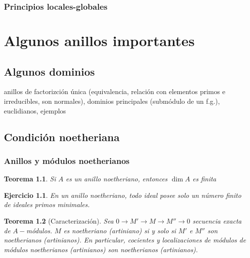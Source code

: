 \documentclass[12pt]{book}
\newtheorem{teo}{Teorema}
\newtheorem{ex}{Ejercicio}
\begin{document}
\subsection{Principios locales-globales}

















\chapter{Algunos anillos importantes}

\section{Algunos dominios}

anillos de factorizción única (equivalencia, relación con elementos primos e irreducibles, son normales), dominios principales (submódulo de un f.g.), euclidianos, ejemplos




\section{Condición noetheriana}

\subsection{Anillos y módulos noetherianos}

\begin{teo}
	Si $A$ es un anillo noetheriano, entonces $\dim A$ es finita
\end{teo}

\begin{ex}
	En un anillo noetheriano, todo ideal posee solo un número finito de ideales primos minimales.
\end{ex}

\begin{teo}[Caracterización]
	Sea $0\rightarrow M' \rightarrow M \rightarrow M''\rightarrow 0 $ secuencia exacta de $A-$módulos. $M$ es noetheriano (artiniano) si y solo si $M'$ e $M''$ son noetherianos (artinianos). En particular, cocientes y localizaciones de módulos de módulos noetherianos (artinianos) son noetherianos (artinianos). 
\end{teo}
\end{document}
